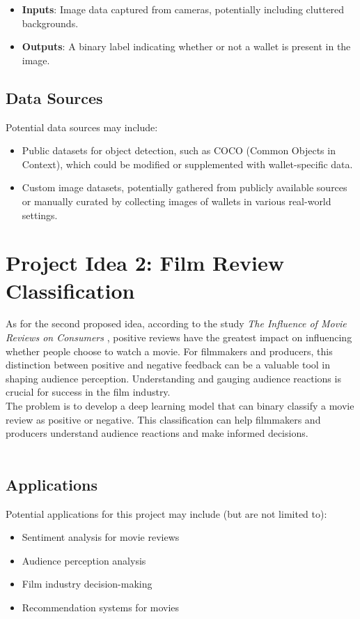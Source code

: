 \documentclass{report}
\begin{document}
\begin{itemize}
    \item \textbf{Inputs}: Image data captured from cameras, potentially including cluttered backgrounds.
    \item \textbf{Outputs}: A binary label indicating whether or not a wallet is present in the image.
\end{itemize}

\subsection{Data Sources}
Potential data sources may include:
\begin{itemize}
    \item Public datasets for object detection, such as COCO (Common Objects in Context), which could be modified or supplemented with wallet-specific data.
    \item Custom image datasets, potentially gathered from publicly available sources or manually curated by collecting images of wallets in various real-world settings.
\end{itemize}




\section{Project Idea 2: Film Review Classification}

As for the second proposed idea, according to the study \textit{The Influence of Movie Reviews on Consumers} \cite{influenceCustomers}, positive reviews have the greatest impact on influencing whether people choose to watch a movie. For filmmakers and producers, this distinction between positive and negative feedback can be a valuable tool in shaping audience perception. Understanding and gauging audience reactions is crucial for success in the film industry.
\\
The problem is to develop a deep learning model that can binary classify a movie review as positive or negative. This classification can help filmmakers and producers understand audience reactions and make informed decisions.
\\
\\
\subsection{Applications}
Potential applications for this project may include (but are not limited to):
\begin{itemize}
    \item Sentiment analysis for movie reviews
    \item Audience perception analysis
    \item Film industry decision-making
    \item Recommendation systems for movies\\
\end{itemize}
\\
\end{document}
